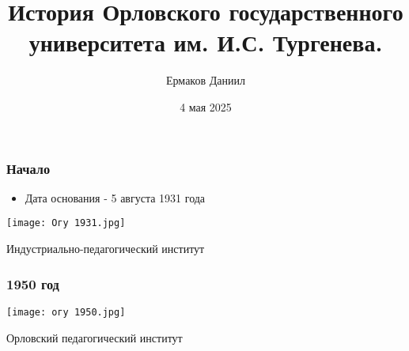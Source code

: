 \documentclass{beamer}
\title{История Орловского государственного университета им. И.С. Тургенева.}
\author{Ермаков Даниил}
\institute{41МО}
\date{4 мая 2025}
\begin{document}
\begin{frame}[plain]

\vfill
\begin{center}
  {\color{white}\Huge\bfseries \inserttitle\par}
  \vspace{1em}
  {\color{white}\Large \insertauthor\par}
  \vspace{0.5em}
  {\color{white}\large \insertinstitute\par}
  \vspace{1em}
  {\color{white}\large \insertdate\par}
\end{center}
\vfill
\end{frame}

\begin{frame}[t]
  \frametitle{Начало}
  \begin{itemize}
    \item Дата основания - 5 августа 1931 года
  \end{itemize}


  \begin{center}
    \texttt{[image: Огу 1931.jpg]}
  \end{center}

  \vspace{-0.5cm}
  \begin{center}
    {\footnotesize Индустриально-педагогический институт}
  \end{center}
\end{frame}


\begin{frame}[t]
  \frametitle{1950 год}
      \begin{center}
    \texttt{[image: огу 1950.jpg]}
  \end{center}

  \vspace{-0.3cm}
  \begin{center}
    {\footnotesize Орловский педагогический институт}
  \end{center}
\end{frame}
\end{document}
